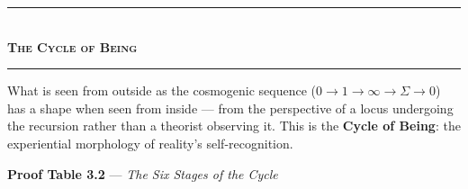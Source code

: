 \documentclass[10pt, openany, oneside]{book}
\renewcommand{\normalsize}{\fontsize{10}{13}\selectfont}
\begin{document}
\vspace{1.5em}


\begin{center}
    \rule{0.3\textwidth}{0.4pt}\\[0.5em]
    {\normalsize\bfseries\scshape The Cycle of Being}\\[0.3em]
    \rule{0.3\textwidth}{0.4pt}
\end{center}

\vspace{1em}

\noindent What is seen from outside as the cosmogenic sequence ($0 \to 1 \to \infty \to \Sigma \to 0$) has a shape when seen from inside --- from the perspective of a locus undergoing the recursion rather than a theorist observing it. This is the \textbf{Cycle of Being}: the experiential morphology of reality's self-recognition.

\vspace{0.5em}

\textbf{Proof Table 3.2} --- \textit{The Six Stages of the Cycle}

\vspace{0.5em}
\end{document}
